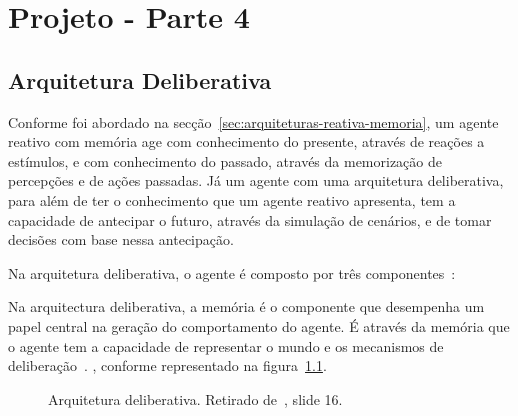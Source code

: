 \chapter{Projeto - Parte 4}\label{ch:projeto-parte4}


\section{Arquitetura Deliberativa}\label{sec:arquitetura-deliberativa}

Conforme foi abordado na secção~\ref{sec:arquiteturas-reativa-memoria}, um agente reativo com memória age com conhecimento do presente, através de reações a estímulos, e com conhecimento do passado, através da memorização de percepções e de ações passadas.
Já um agente com uma arquitetura deliberativa, para além de ter o conhecimento que um agente reativo apresenta, tem a capacidade de antecipar o futuro, através da simulação de cenários, e de tomar decisões com base nessa antecipação.

Na arquitetura deliberativa, o agente é composto por três componentes~\cite{isel:iasa:slides:arq-agentes-deliberativos}:

Na arquitectura deliberativa, a memória é o componente que desempenha um papel central na geração do comportamento do agente.
É através da memória que o agente tem a capacidade de representar o mundo e os mecanismos de deliberação~\cite{isel:iasa:slides:arq-agentes-deliberativos}.
, conforme representado na figura~\ref{fig:arquitetura-deliberativa}.

\begin{figure}[H]
    \begin{center}
    \end{center}
    \caption{Arquitetura deliberativa.
    Retirado de~\cite{isel:iasa:slides:arq-agentes-deliberativos}, slide 16.}
    \label{fig:arquitetura-deliberativa}
\end{figure}

